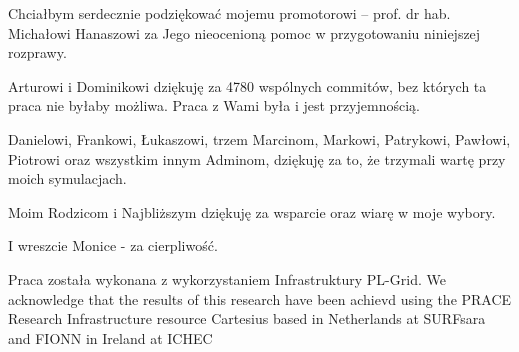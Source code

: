 
\noindent Chciałbym serdecznie podziękować mojemu promotorowi -- prof. dr hab. Michałowi Hanaszowi za
Jego nieocenioną pomoc w przygotowaniu niniejszej rozprawy.

\bigskip

\noindent Arturowi i Dominikowi dziękuję za 4780 wspólnych commitów, bez których ta praca nie byłaby możliwa. Praca z Wami była i jest przyjemnością.

\bigskip

\noindent Danielowi, Frankowi, Łukaszowi, trzem Marcinom, Markowi, Patrykowi, Pawłowi, Pio\-tro\-wi oraz wszystkim innym
Adminom, dziękuję za to, że trzymali wartę przy moich symulacjach.

\bigskip

\noindent Moim Rodzicom i Najbliższym dziękuję za wsparcie oraz wiarę w moje wybory.

\bigskip

\noindent I wreszcie Monice - za cierpliwość.

\vfill

\noindent Praca została wykonana z wykorzystaniem Infrastruktury PL-Grid. We acknowledge that the results of this
research have been achievd using the PRACE Research Infrastructure resource Cartesius based in Netherlands at SURFsara
and FIONN in Ireland at ICHEC
